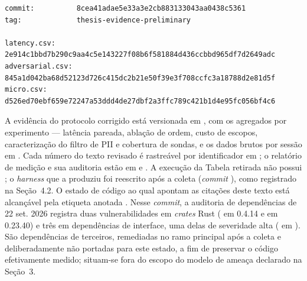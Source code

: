 \documentclass[12pt,openright,twoside,a4paper,english,brazil]{abntex2}
\begin{document}
\begin{apendicesenv}
\begingroup
\footnotesize
\begin{verbatim}
commit:          8cea41adae5e33a3e2cb883133043aa0438c5361
tag:             thesis-evidence-preliminary

latency.csv:     2e914c1bbd7b290c9aa4c5e143227f08b6f581884d436ccbbd965df7d2649adc
adversarial.csv: 845a1d042ba68d52123d726c415dc2b21e50f39e3f708ccfc3a18788d2e81d5f
micro.csv:       d526ed70ebf659e72247a53ddd4de27dbf2a3ffc789c421b1d4e95fc056bf4c6
\end{verbatim}
\endgroup

{\sloppy A evidência do protocolo corrigido está versionada em , com os agregados por experimento --- latência pareada, ablação de ordem, custo de escopos, caracterização do filtro de PII e cobertura de sondas, e os dados brutos por sessão em . Cada número do texto revisado é rastreável por identificador em ; o relatório de medição e sua auditoria estão em  e . A execução da Tabela retirada não possui ; o \textit{harness} que a produziu foi reescrito após a coleta (\textit{commit} ), como registrado na Seção~4.2. O estado de código ao qual apontam as citações  deste texto está alcançável pela etiqueta anotada . Nesse \textit{commit}, a auditoria de dependências de 22 set. 2026 registra duas vulnerabilidades em \textit{crates} Rust ( em  0.4.14 e  em  0.23.40) e três em dependências de interface, uma delas de severidade alta ( em ). São dependências de terceiros, remediadas no ramo principal após a coleta e deliberadamente não portadas para este estado, a fim de preservar o código efetivamente medido; situam-se fora do escopo do modelo de ameaça declarado na Seção~3.\par}
\end{apendicesenv}
\end{document}
